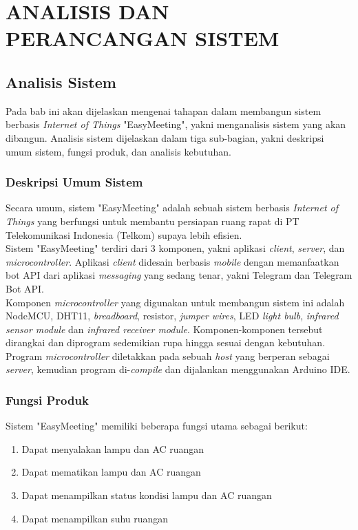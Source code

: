 \chapter{ANALISIS DAN PERANCANGAN SISTEM}
\section{Analisis Sistem}
\tab Pada bab ini akan dijelaskan mengenai tahapan dalam membangun sistem berbasis \textit{Internet of Things} "EasyMeeting", yakni menganalisis sistem yang akan dibangun. Analisis sistem dijelaskan dalam tiga sub-bagian, yakni deskripsi umum sistem, fungsi produk, dan analisis kebutuhan.

\subsection{Deskripsi Umum Sistem}
\tab Secara umum, sistem "EasyMeeting" adalah sebuah sistem berbasis \textit{Internet of Things} yang berfungsi untuk membantu persiapan ruang rapat di PT Telekomunikasi Indonesia (Telkom) supaya lebih efisien.\\
\tab Sistem "EasyMeeting" terdiri dari 3 komponen, yakni aplikasi \textit{client}, \textit{server}, dan \textit{microcontroller}. Aplikasi \textit{client} didesain berbasis \textit{mobile} dengan memanfaatkan bot API dari aplikasi \textit{messaging} yang sedang tenar, yakni Telegram dan Telegram Bot API. \\
\tab Komponen \textit{microcontroller} yang digunakan untuk membangun sistem ini adalah NodeMCU, DHT11, \textit{breadboard}, resistor, \textit{jumper wires}, LED \textit{light bulb}, \textit{infrared sensor module} dan \textit{infrared receiver module}. Komponen-komponen tersebut dirangkai dan diprogram sedemikian rupa hingga sesuai dengan kebutuhan. Program \textit{microcontroller} diletakkan pada sebuah \textit{host} yang berperan sebagai \textit{server}, kemudian program di-\textit{compile} dan dijalankan menggunakan Arduino IDE.

\subsection{Fungsi Produk}
\tab Sistem "EasyMeeting" memiliki beberapa fungsi utama sebagai berikut:
\begin{enumerate}
	\item Dapat menyalakan lampu dan AC ruangan
	\item Dapat mematikan lampu dan AC ruangan
	\item Dapat menampilkan status kondisi lampu dan AC ruangan
	\item Dapat menampilkan suhu ruangan
\end{enumerate}

